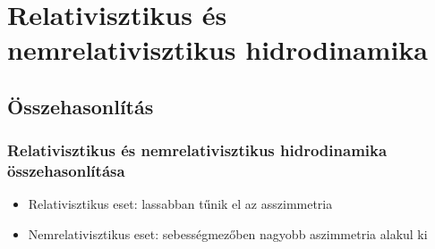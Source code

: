 \documentclass{beamer}
\begin{document}
\begin{frame}
\begin{center}
\begin{figure}[H]
\begin{subfigure}[b]{0.49\textwidth}
	\end{subfigure}
\end{figure}
\end{center}
\begin{center}

\end{center}\end{frame}



\section{Relativisztikus és nemrelativisztikus hidrodinamika}
\subsection{Összehasonlítás}
\begin{frame}
\frametitle{Relativisztikus és nemrelativisztikus hidrodinamika összehasonlítása}
\begin{center}
\begin{itemize}
\setlength{\itemsep}{12pt}
\item<1-> Relativisztikus eset: lassabban tűnik el az asszimmetria
\item<1-> Nemrelativisztikus eset: sebességmezőben nagyobb aszimmetria alakul ki


\end{itemize}
\end{center}
\end{frame}
\end{document}
